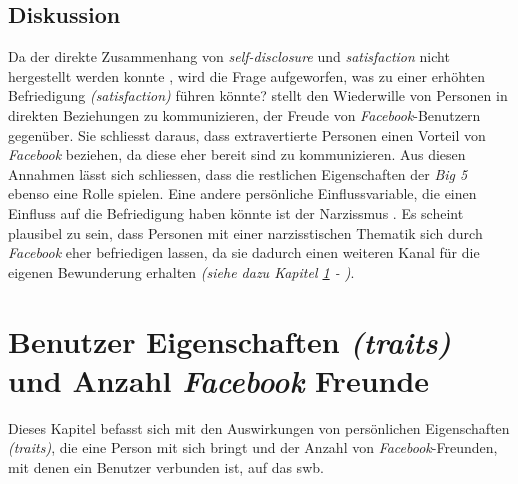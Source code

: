 \subsection{Diskussion}\label{subsec.amountDiskussion}
Da der direkte Zusammenhang von \textit{self-disclosure} und \textit{satisfaction} nicht hergestellt werden konnte \cite{Special:2012}, wird die Frage aufgeworfen, was zu einer erhöhten Befriedigung \textit{(satisfaction)} führen könnte?  stellt den Wiederwille von Personen in direkten Beziehungen zu kommunizieren, der Freude von \textit{Facebook}-Benutzern gegenüber. Sie schliesst daraus, dass extravertierte Personen einen Vorteil von \textit{Facebook} beziehen, da diese eher bereit sind zu kommunizieren. Aus diesen Annahmen lässt sich schliessen, dass die restlichen Eigenschaften der \textit{Big 5} ebenso eine Rolle spielen.\newline
Eine andere persönliche Einflussvariable, die einen Einfluss auf die Befriedigung haben könnte ist der Narzissmus \cite{Special:2012}. Es scheint plausibel zu sein, dass Personen mit einer narzisstischen Thematik sich durch \textit{Facebook} eher befriedigen lassen, da sie dadurch einen weiteren Kanal für die eigenen Bewunderung erhalten \textit{(siehe dazu Kapitel \ref{sub.traits} - )}.

\section{Benutzer Eigenschaften \textit{(traits)} und Anzahl \textit{Facebook} Freunde}\label{sub.traits}
Dieses Kapitel befasst sich mit den Auswirkungen von persönlichen Eigenschaften \textit{(traits)}, die eine Person mit sich bringt und der Anzahl von \textit{Facebook}-Freunden, mit denen ein Benutzer verbunden ist, auf das \gls{swb}.

